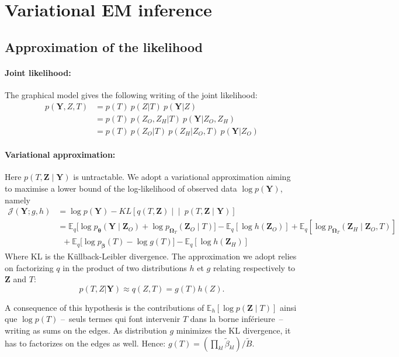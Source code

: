 \documentclass[11pt,a4paper]{article}
\newcommand{\betabf}{\boldsymbol{\beta}}
\newcommand{\thetabf}{\boldsymbol{\theta}}
\newcommand{\Omegabf}{\boldsymbol{\Omega}}
\newcommand{\Ybf}{\boldsymbol{Y}}
\newcommand{\Zbf}{\boldsymbol{Z}}
\newcommand{\Esp}{\mathds{E}}
\begin{document}
\section{Variational EM inference}
\subsection{Approximation of the likelihood}
\paragraph{Joint likelihood:}
The graphical model gives the following writing of the joint likelihood:
\begin{align*}
p(\Ybf,Z,T)& = p(T) \: p(Z|T) \: p(\Ybf|Z) \\
&= p(T)\: p(Z_O,Z_H|T) \: p(\Ybf|Z_O,Z_H) \\
&= p(T) \: p(Z_O|T) \: p(Z_H | Z_O,T)  \: p(\Ybf|Z_O)
\end{align*} 


\paragraph{Variational approximation:}

Here $p(T,\Zbf \mid \Ybf)$ is untractable. We adopt a variational approximation aiming to maximise a lower bound of the log-likelihood of observed data $\log p(\Ybf)$, namely  
\begin{align*}
    \mathcal{J}(\Ybf; g,h)
    & = \log p(\Ybf) - KL\left[q(T,\Zbf) \middle\vert\middle\vert\ p(T,\Zbf \mid \Ybf)\right]\\
    & =\Esp_{q}\big[\log p_{\thetabf}(\Ybf\mid \Zbf_O)+ \log p_{\Omegabf_T}(\Zbf_O \mid T)\big]-\Esp_q[\log h(\Zbf_O)]  +\Esp_{q}[\log p_{\Omegabf_T}(\Zbf_H \mid \Zbf_O,T)] \\
    & \;\; +\Esp_q\big[\log p_{\betabf}(T) - \log g(T)\big]  -\Esp_q[\log h(\Zbf_H)]
\end{align*}
Where KL is the Küllback-Leibler divergence. The approximation we adopt relies on factorizing $q$ in the product of two distributions $h$ et $g$ relating respectively to $\Zbf$  and $T$: 
$$p(T,Z | \Ybf) \approx  q(Z,T) = g(T)h(Z).$$

 A consequence of this hypothesis is the contributions of   $\Esp_h[\log p(\Zbf\mid T)]$ ainsi que $\log p(T)$ --~seuls termes qui font intervenir $T$ dans la borne inférieure~-- writing as sums on the edges. As distribution   $g$ minimizes the KL divergence, it has to factorizes on the edges as well. Hence:
$ g(T) = \left(\prod_{kl} \widetilde{\beta}_{kl} \right) / \widetilde{B}$. \\
 
\end{document}
